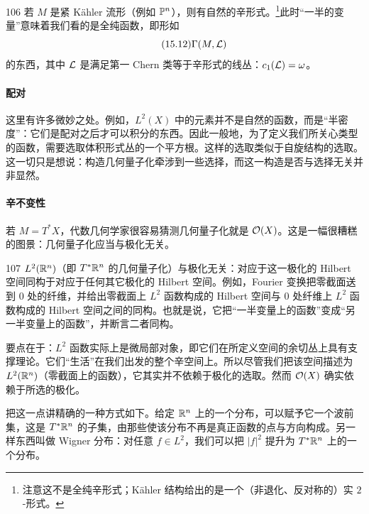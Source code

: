 \begin{srcex}{106}
若 $M$ 是紧 Kähler 流形（例如 $\mathbb{P}^n$），则有自然的辛形式。\footnote{注意这不是全纯辛形式；Kähler 结构给出的是一个（非退化、反对称的）实 $2$-形式。}此时“一半的变量”意味着我们看的是全纯函数，即形如
\begin{equation}\tag{15.12}
\Gamma(M,\mathcal{L})
\end{equation}
的东西，其中 $\mathcal{L}$ 是满足第一 Chern 类等于辛形式的线丛：$c_1(\mathcal{L})=\omega$。
\end{srcex}

\paragraph{配对}

这里有许多微妙之处。例如，$L^2(X)$ 中的元素并不是自然的函数，而是“半密度”：它们是配对之后才可以积分的东西。因此一般地，为了定义我们所关心类型的函数，需要选取体积形式丛的一个平方根。这样的选取类似于自旋结构的选取。这一切只是想说：构造几何量子化牵涉到一些选择，而这一构造是否与选择无关并非显然。

\paragraph{辛不变性}

若 $M=T^*X$，代数几何学家很容易猜测几何量子化就是 $\mathcal{O}(X)$。这是一幅很糟糕的图景：几何量子化应当与极化无关。

\begin{srcex}{107}
$L^2(\mathbb{R}^n)$（即 $T^*\mathbb{R}^n$ 的几何量子化）与极化无关：对应于这一极化的 Hilbert 空间同构于对应于任何其它极化的 Hilbert 空间。例如，Fourier 变换把零截面送到 $0$ 处的纤维，并给出零截面上 $L^2$ 函数构成的 Hilbert 空间与 $0$ 处纤维上 $L^2$ 函数构成的 Hilbert 空间之间的同构。也就是说，它把“一半变量上的函数”变成“另一半变量上的函数”，并断言二者同构。
\end{srcex}

要点在于：$L^2$ 函数实际上是微局部对象，即它们在所定义空间的余切丛上具有支撑理论。它们“生活”在我们出发的整个辛空间上。所以尽管我们把该空间描述为 $L^2(\mathbb{R}^n)$（零截面上的函数），它其实并不依赖于极化的选取。然而 $\mathcal{O}(X)$ 确实依赖于所选的极化。

把这一点讲精确的一种方式如下。给定 $\mathbb{R}^n$ 上的一个分布，可以赋予它一个波前集，这是 $T^*\mathbb{R}^n$ 的子集，由那些使该分布不再是真正函数的点与方向构成。另一样东西叫做 Wigner 分布：对任意 $f\in L^2$，我们可以把 $|f|^2$ 提升为 $T^*\mathbb{R}^n$ 上的一个分布。%

